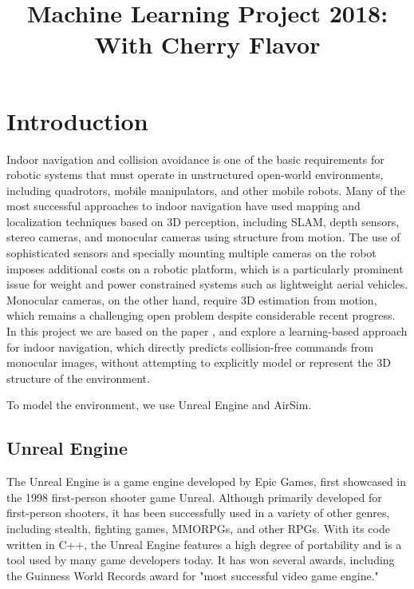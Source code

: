 \documentclass{article}
\begin{document}
\title{Machine Learning Project 2018: With Cherry Flavor}
\maketitle

\small

\section{Introduction}

Indoor  navigation  and  collision  avoidance  is  one  of  the
basic  requirements  for  robotic  systems  that  must  operate  in
unstructured  open-world  environments,  including  quadrotors,
mobile  manipulators,  and  other  mobile  robots.  Many  of  the
most successful approaches to indoor navigation have used
mapping  and  localization  techniques  based  on  3D
perception,  including  SLAM,  depth  sensors,  stereo  cameras,
and  monocular  cameras  using  structure  from  motion.
The use of sophisticated sensors and specially mounting multiple
cameras on the robot imposes additional costs on
a  robotic  platform,  which  is  a  particularly  prominent  issue
for weight and power constrained systems such as lightweight
aerial vehicles. Monocular cameras, on the other hand, require
3D  estimation  from  motion,  which  remains  a  challenging
open  problem  despite  considerable  recent  progress.
In this project we are based on the paper \cite{cad2rl},
and explore a learning-based approach for indoor
navigation,  which  directly  predicts  collision-free
commands from monocular images, without attempting to
explicitly  model  or  represent  the  3D  structure
of  the  environment.

To model the environment, we use Unreal Engine and AirSim.

\subsection{Unreal Engine}

The Unreal Engine is a game engine developed by Epic Games,
first showcased in the 1998 first-person shooter game Unreal.
Although primarily developed for first-person shooters, it has
been successfully used in a variety of other genres, including
stealth, fighting games, MMORPGs, and other RPGs. With its code
written in C++, the Unreal Engine features a high degree of portability
and is a tool used by many game developers today. It has won several
awards, including the Guinness World Records award
for "most successful video game engine."
\end{document}
